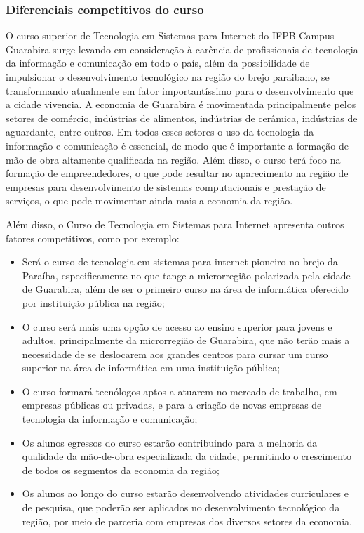 \subsubsection{Diferenciais competitivos do curso}

 O curso superior de Tecnologia em Sistemas para Internet do IFPB-Campus Guarabira surge levando em consideração à carência de profissionais de tecnologia da informação e comunicação em todo o país, além da possibilidade de impulsionar o desenvolvimento tecnológico na região do brejo paraibano, se transformando atualmente em fator importantíssimo para o desenvolvimento que a cidade vivencia. A economia de Guarabira é movimentada principalmente pelos setores de comércio, indústrias de alimentos, indústrias de cerâmica, indústrias de aguardante, entre outros. Em todos esses setores o uso da tecnologia da informação e comunicação é essencial, de modo que é importante a formação de mão de obra altamente qualificada na região. Além disso, o curso terá foco na formação de empreendedores, o que pode resultar no aparecimento na região de empresas para desenvolvimento de sistemas computacionais e prestação de serviços, o que pode movimentar ainda mais a economia da região.
 
 Além disso, o Curso de Tecnologia em Sistemas para Internet apresenta outros fatores competitivos, como por exemplo: 

\begin{itemize}
	
\item Será o curso de tecnologia em sistemas para internet pioneiro no brejo da Paraíba, especificamente no que tange a microrregião polarizada pela cidade de Guarabira, além de ser o primeiro curso na área de informática oferecido por instituição pública na região;

\item O curso será mais uma opção de acesso ao ensino superior para jovens e adultos, principalmente da microrregião de Guarabira, que não terão mais a necessidade de se deslocarem aos grandes centros para cursar um curso superior na área de informática em uma instituição pública;

\item O curso formará tecnólogos aptos a atuarem no mercado de trabalho, em empresas públicas ou privadas, e para a criação de novas empresas de tecnologia da informação e comunicação; 

\item Os alunos egressos do curso estarão contribuindo para a melhoria da qualidade da mão-de-obra especializada da cidade, permitindo o crescimento de todos os segmentos da economia da região;

\item Os alunos ao longo do curso estarão desenvolvendo atividades curriculares e de pesquisa, que poderão ser aplicados no desenvolvimento tecnológico da região, por meio de parceria com empresas dos diversos setores da economia.

\end{itemize}



